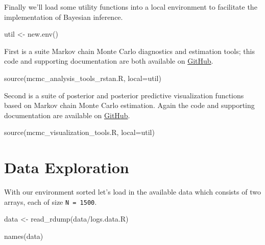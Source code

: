 \documentclass[
  letterpaper,
  DIV=11,
  numbers=noendperiod]{scrartcl}
\newenvironment{Shaded}{\begin{snugshade}}{\end{snugshade}}
\newcommand{\AttributeTok}[1]{\textcolor[rgb]{0.40,0.45,0.13}{#1}}
\newcommand{\FunctionTok}[1]{\textcolor[rgb]{0.28,0.35,0.67}{#1}}
\newcommand{\NormalTok}[1]{\textcolor[rgb]{0.00,0.23,0.31}{#1}}
\newcommand{\OtherTok}[1]{\textcolor[rgb]{0.00,0.23,0.31}{#1}}
\newcommand{\StringTok}[1]{\textcolor[rgb]{0.13,0.47,0.30}{#1}}
\begin{document}
Finally we'll load some utility functions into a local environment to
facilitate the implementation of Bayesian inference.

\begin{Shaded}
\begin{Highlighting}[]
\NormalTok{util }\OtherTok{\textless{}{-}} \FunctionTok{new.env}\NormalTok{()}
\end{Highlighting}
\end{Shaded}

First is a suite Markov chain Monte Carlo diagnostics and estimation
tools; this code and supporting documentation are both available on
\href{https://github.com/betanalpha/mcmc_diagnostics}{GitHub}.

\begin{Shaded}
\begin{Highlighting}[]
\FunctionTok{source}\NormalTok{(}\StringTok{\textquotesingle{}mcmc\_analysis\_tools\_rstan.R\textquotesingle{}}\NormalTok{, }\AttributeTok{local=}\NormalTok{util)}
\end{Highlighting}
\end{Shaded}

Second is a suite of posterior and posterior predictive visualization
functions based on Markov chain Monte Carlo estimation. Again the code
and supporting documentation are available on
\href{https://github.com/betanalpha/mcmc_visualization_tools}{GitHub}.

\begin{Shaded}
\begin{Highlighting}[]
\FunctionTok{source}\NormalTok{(}\StringTok{\textquotesingle{}mcmc\_visualization\_tools.R\textquotesingle{}}\NormalTok{, }\AttributeTok{local=}\NormalTok{util)}
\end{Highlighting}
\end{Shaded}

\section{Data Exploration}\label{data-exploration}

With our environment sorted let's load in the available data which
consists of two arrays, each of size \texttt{N\ =\ 1500}.

\begin{Shaded}
\begin{Highlighting}[]
\NormalTok{data }\OtherTok{\textless{}{-}} \FunctionTok{read\_rdump}\NormalTok{(}\StringTok{\textquotesingle{}data/logs.data.R\textquotesingle{}}\NormalTok{)}

\FunctionTok{names}\NormalTok{(data)}
\end{Highlighting}
\end{Shaded}
\end{document}
